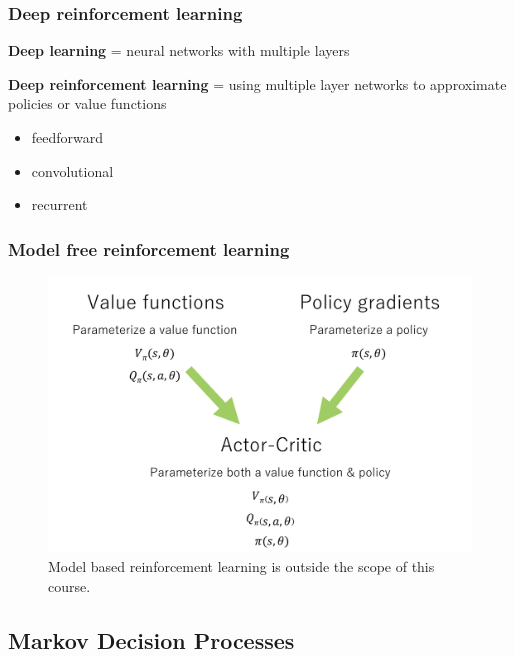\documentclass[]{article}
\providecommand{\tightlist}{%
  \setlength{\itemsep}{0pt}\setlength{\parskip}{0pt}}
\begin{document}
\hypertarget{deep-reinforcement-learning}{%
\subsubsection{Deep reinforcement
learning}\label{deep-reinforcement-learning}}

\textbf{Deep learning} = neural networks with multiple layers

\textbf{Deep reinforcement learning} = using multiple layer networks to
approximate policies or value functions

\begin{itemize}
\tightlist
\item
  feedforward
\item
  convolutional
\item
  recurrent
\end{itemize}

\newpage

\hypertarget{model-free-reinforcement-learning}{%
\subsubsection{Model free reinforcement
learning}\label{model-free-reinforcement-learning}}

\begin{figure}
\centering
\includegraphics[width=\textwidth,height=0.3\textheight]{./tex2pdf.-4c1708fb449e9e84/7045eaef9110e46e3c6e0f51f24effa39b42af6b.png}
\caption{Model based reinforcement learning is outside the scope of this
course.}
\end{figure}

\newpage

\hypertarget{markov-decision-processes}{%
\subsection{Markov Decision Processes}\label{markov-decision-processes}}
\end{document}
